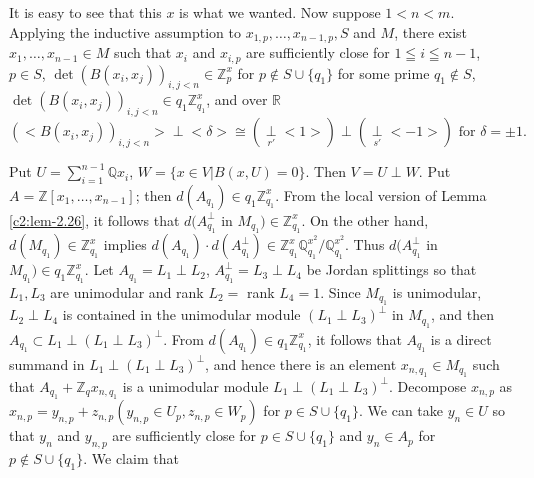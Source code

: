 It is easy to see that this $x$ is what we wanted. Now suppose
$1<n<m$. Applying the inductive assumption to $x_{1,p}, \ldots,
x_{n-1,p}, S$ and $M$, there exist $x_1, \ldots, x_{n-1} \in
M$ such that $x_i$ and $x_{i,p}$ are sufficiently close for $1\leqq
i \leqq n -1$, $p\in S$, $\det (B(x_i,
x_j))_{i,j<n} \in \mathbb{Z}^x_p$ \pageoriginale for $p\not\in
S \cup \{q_1\}$ for some prime $q_1 \not\in S$, $\det(B(x_i,
x_j))_{i,j<n} \in q_1 \mathbb{Z}^x_{q_1}$, and over
$\mathbb{R}$
$$
(<B(x_i, x_j))_{i,j<n} > \perp <\delta> \cong
(\mathop{\perp}\limits_{r'} <1>) \perp (\mathop{\perp}\limits_{s'}
<-1>) \text{ for } \delta =\pm 1.
$$

Put $U = \sum\limits^{n-1}_{i=1} \mathbb{Q}x_i$, $W=\{x\in
V|B(x,U)=0\}$. Then $V=U\perp W$. Put $A =\mathbb{Z}[x_1,\ldots,
x_{n-1}]$; then $d(A_{q_1}) \in q_1 \mathbb{Z}^x_{q_1}$. From
the local version of Lemma \ref{c2:lem-2.26}, it follows that $d(A^{\perp}_{q_1}$
in $M_{q_1}) \in \mathbb{Z}^x_{q_1}$. On the other hand,
$d(M_{q_1})\in \mathbb{Z}^x_{q_1}$ implies $d(A_{q_1})\cdot
d(A^{\perp}_{q_1}) \in \mathbb{Z}^x_{q_1} \mathbb{Q}^{x^2}_{q_1}/ 
\mathbb{Q}^{x^2}_{q_1}$. Thus $d(A^{\perp}_{q_1}$ in
$M_{q_1})\in q_1\mathbb{Z}^x_{q_1}$. Let $A_{q_1} = L_1 \perp
L_2$, $A^{\perp}_{q_1} = L_3 \perp L_4$ be Jordan splittings so that
$L_1, L_3$ are unimodular and rank $L_2 = $ rank $L_4=1$. Since
$M_{q_1}$ is unimodular, $L_2 \perp L_4$ is contained in the
unimodular module $(L_1 \perp L_3)^{\perp}$ in $M_{q_1}$, and then
$A_{q_1} \subset L_1 \perp (L_1 \perp L_3)^{\perp}$. From
$d(A_{q_1}) \in q_1 \mathbb{Z}^x_{q_1}$, it follows that
$A_{q_1}$ is a direct summand in $L_1 \perp (L_1 \perp L_3)^{\perp}$,
and hence there is an element $x_{n,q_1}\in M_{q_1}$ such that
$A_{q_1} + \mathbb{Z}_{q}x_{n,q_1}$ is a unimodular module
$L_1\perp(L_1 \perp L_3)^{\perp}$. Decompose $x_{n,p}$ as
$x_{n,p}=y_{n,p} + z_{n,p}(y_{n,p}\in U_p, z_{n,p} \in
W_p)$ for $p\in S \cup \{ q_1\}$. We can take $y_n \in
U$ so that $y_n$ and $y_{n,p}$ are sufficiently close for
$p\in S \cup \{ q_1\}$ and $y_n \in A_p$ for $p\not\in
S \cup \{ q_1\}$. We claim that 

